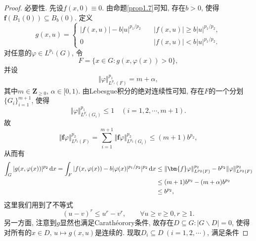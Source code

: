 \begin{proposition}
\begin{proof}
        必要性. 先设$f(x, 0) \equiv 0$. 由命题\ref{prop1.7}可知, 存在$b > 0$, 使得$\bm{f}(B_1(0)) \subseteq B_b(0)$. 定义 
        \begin{equation*}
            g(x, u) = 
            \begin{cases}
                |f(x, u)| - b|u|^{p_1/p_2} \quad &|f(x, u)| \geq b|u|^{p_1/p_2}, \\ 
                0 \quad &|f(x, u)| < b|u|^{p_1/p_2}.            \end{cases}
        \end{equation*}
        对任意的$\varphi \in L^{p_1}(G)$, 令 
        \begin{equation*}
            F = \{x \in G\colon g(x, \varphi(x)) > 0\},
        \end{equation*}
        并设
        \begin{equation*}
            \Vert \varphi\Vert_{L^{p_1}(F)}^{p_1} = m + \alpha,
        \end{equation*}
        其中$m \in \mathbf{Z}_{\geq 0}$, $\alpha \in [0, 1)$. 由Lebesgue积分的绝对连续性可知, 存在$F$的一个分划$\{G_i\}_{i = 1}^{m + 1}$, 使得 
        \begin{equation*}
            \Vert \varphi\Vert_{L^{p_1}(G_i)}^{p_1} \leq 1 \quad (i = 1, 2, \cdots, m + 1).
        \end{equation*}
        故
        \begin{equation*}
            \Vert \bm{f}\varphi\Vert_{L^{p_2}(F)}^{p_2} = \sum_{i = 1}^{m + 1}\Vert \bm{f}\varphi\Vert_{L^{p_2}(G_i)}^{p_2} \leq (m + 1)b^{p_2},
        \end{equation*}
        从而有 
        \begin{equation}\label{6}
            \begin{aligned}
            \int_G|g(x, \varphi(x))|^{p_2} \,{\rm d}x = \int_F|f(x, \varphi(x)) - b|\varphi(x)|^{p_1/p_2}|^{p_2} \,{\rm d}x &\leq \Vert \bm{f}\varphi\Vert_{L^{p_2}(F)}^{p_2} - b^{p_2}\Vert \varphi\Vert_{L^{p_2}(F)}^{p_2} \\ 
            &\leq (m + 1)b^{p_2} - (m + \alpha)b^{p_2} \\
            &\leq b^{p_2},
            \end{aligned}
        \end{equation}
        这里我们用到了不等式 
        \begin{equation*}
            (u - v)^r \leq u^r - v^r, \qquad \forall u \geq v \geq 0, r \geq 1.
        \end{equation*}
        另一方面, 注意到$g$显然也满足Carath\'eorory条件, 故存在$D \subseteq G\colon |G \smallsetminus D| = 0$, 使得对所有的$x \in D$, $u \mapsto g(x, u)$是连续的. 现取$D_i \subseteq D\ (i = 1, 2, \cdots)$, 满足条件 

\end{proof}
\end{proposition}
